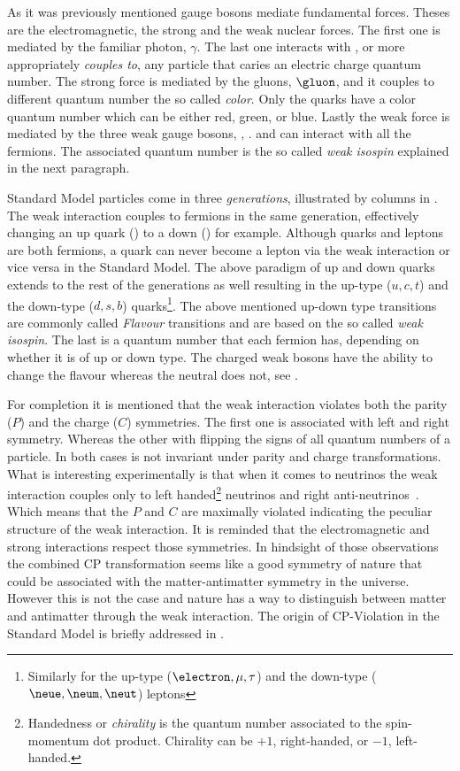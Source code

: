 As it was previously mentioned gauge bosons mediate fundamental forces. Theses are the electromagnetic, the strong and the weak nuclear forces.
The first one is mediated by the familiar photon, $\gamma$. The last one interacts with , or more appropriately {\it couples to}, any particle that
caries an electric charge quantum number. The strong force is mediated by the gluons, $\gluon$, and it couples to different quantum number the so
called {\it color}. Only the quarks have a color quantum number which can be either red, green, or blue. Lastly the weak force is mediated
by the three weak gauge bosons, \Wpm, \Z. and can interact with all the fermions. The associated quantum number is the so called {\it weak isospin}
explained in the next paragraph.

Standard Model particles come in three {\it generations}, illustrated by columns in .
The weak interaction couples to fermions in the same generation, effectively changing an up quark (\uquark) to a down (\dquark) for example.
Although quarks and leptons are both fermions, a quark can never become a lepton via the weak interaction or vice versa in the Standard Model.
The above paradigm of up and down quarks extends to the rest of the generations as well resulting in the up-type ($u,c,t$) and the down-type ($d,s,b$)
quarks\footnote{Similarly for the  up-type ($\electron,\mu,\tau$) and the down-type ($\neue,\neum,\neut$) leptons}. The above mentioned up-down type
transitions are commonly called {\it Flavour} transitions
and are based on the so called {\it weak isospin}. The last is a quantum number that each fermion has, depending on
whether it is of up or down type. The charged weak bosons \Wpm have the ability to change the flavour whereas the neutral \Z  does not, see .

For completion it is mentioned that the weak interaction violates both the parity ($P$) and the charge ($C$) symmetries.
The first one is associated with left and right symmetry. Whereas the other with flipping the signs of all quantum numbers of a particle.
In both cases  is not invariant under parity and charge transformations. What is interesting experimentally
is that when it comes to neutrinos the weak interaction couples only to left handed\footnote{Handedness or {\it chirality} is the quantum number associated to the spin-momentum dot product.
Chirality can be $+1$, right-handed,  or $-1$, left-handed. } neutrinos and right anti-neutrinos~\cite{wu-parity,garwin-parity}.
Which means that the $P$ and $C$ are maximally violated indicating the peculiar structure of the weak interaction. It is reminded that
the electromagnetic and strong interactions respect those symmetries. In hindsight of those observations the combined CP transformation
seems like a good symmetry of nature that could be associated with the matter-antimatter symmetry in the universe.
However this is not the case and nature has a way to distinguish between matter and antimatter through the weak interaction.
The origin of CP-Violation in the Standard Model is briefly addressed in .


